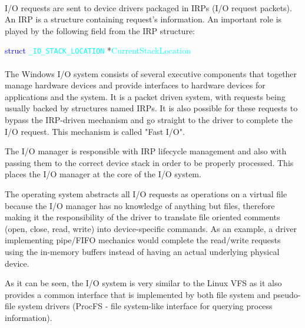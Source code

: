 		\paragraph{}
		I/O requests are sent to device drivers packaged in IRPs (I/O request packets). An IRP is a structure containing request's information. An important role is played by the following field from the IRP structure\cite{MSDNIORequests}:
		\bigskip
		
			\centerline{\textcolor{blue}{struct} \textcolor{cyan}{\texttt{\_IO\_STACK\_LOCATION}} *\textcolor{cyan}{CurrentStackLocation}}
		
		\bigskip	
		\paragraph{}
		The Windows I/O system consists of several executive components that together manage hardware devices and provide interfaces to hardware devices for applications and the system\cite{WindowsInternals}. It is a packet driven system, with requests being usually backed by structures named IRPs. It is also possible for these requests to bypass the IRP-driven mechanism and go straight to the driver to complete the I/O request. This mechanism is called "Fast I/O".
		
		The I/O manager is responsible with IRP lifecycle management and also with passing them to the correct device stack in order to be properly processed. This places the I/O manager at the core of the I/O system. 
		
		
		The operating system abstracts all I/O requests as operations on a virtual file because the I/O manager has no knowledge of anything but files, therefore making it the responsibility of the driver to translate file oriented comments (open, close, read, write) into device-specific commands\cite{WindowsInternals}. As an example, a driver implementing pipe/FIFO mechanics would complete the read/write requests using the in-memory buffers instead of having an actual underlying physical device. 
		
		As it can be seen, the I/O system is very similar to the Linux VFS as it also provides a common interface that is implemented by both file system and pseudo-file system drivers (ProcFS - file system-like interface for querying process information).\\
		
